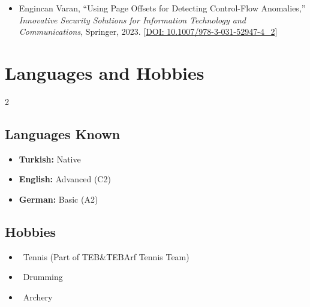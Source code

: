\documentclass[a4paper,10pt]{article}
\begin{document}
\begin{itemize}[label=--,leftmargin=*]
    \item Engincan Varan, ``Using Page Offsets for Detecting Control-Flow Anomalies,''
\textit{Innovative Security Solutions for Information Technology and Communications}, Springer, 2023. [\href{https://doi.org/10.1007/978-3-031-52947-4_2}{DOI: 10.1007/978-3-031-52947-4\_2}]
\end{itemize}

\vspace{-0.5cm}
\section{Languages and Hobbies}
\vspace{-0.5cm}
\begin{multicols}{2}
    \subsection*{Languages Known}
    \begin{itemize}[label=--,leftmargin=*]
        \item \textbf{Turkish:} Native
        \item \textbf{English:} Advanced (C2)
        \item \textbf{German:} Basic (A2)
    \end{itemize}
    \subsection*{Hobbies}
    \begin{itemize}[label=--,leftmargin=*]
        \item \faTrophy \ Tennis (Part of TEB\&TEBArf Tennis Team)
        \item \faMusic \ Drumming
        \item \faBullseye \ Archery
    \end{itemize}
\end{multicols}
\end{document}
